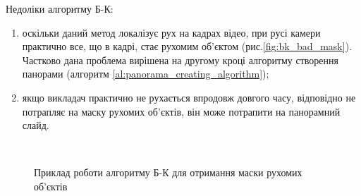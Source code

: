 Недоліки алгоритму Б-К:
\begin{enumerate}
    \item оскільки даний метод локалізує рух на кадрах відео,
          при русі камери практично все, що в кадрі, стає рухомим об'єктом
          (рис.\ref{fig:bk_bad_mask}).
          Частково дана проблема вирішена на другому кроці алгоритму створення панорами
          (алгоритм \ref{al:panorama_creating_algorithm});
    \item якщо викладач практично не рухається впродовж довгого часу, відповідно не потрапляє
          на маску рухомих об'єктів, він може потрапити на панорамний слайд.
\end{enumerate}
\begin{figure}[H]
    \centering

    \\
    \caption{Приклад роботи алгоритму Б-К для отримання маски рухомих об'єктів
        \label{fig:bk_examples}
    }
\end{figure}

